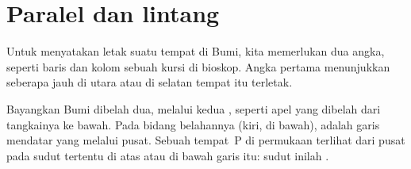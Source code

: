 \section{Paralel dan lintang}

Untuk menyatakan letak suatu tempat di Bumi, kita memerlukan dua angka,
seperti baris dan kolom sebuah kursi di bioskop. Angka pertama menunjukkan
seberapa jauh di utara atau di selatan  tempat itu terletak.

Bayangkan Bumi dibelah dua, melalui kedua , seperti apel yang dibelah
dari tangkainya ke bawah. Pada bidang belahannya (kiri, di bawah),
 adalah garis mendatar yang melalui pusat. Sebuah tempat~P di
permukaan terlihat dari pusat pada sudut tertentu di atas atau di bawah
garis itu: sudut inilah .

